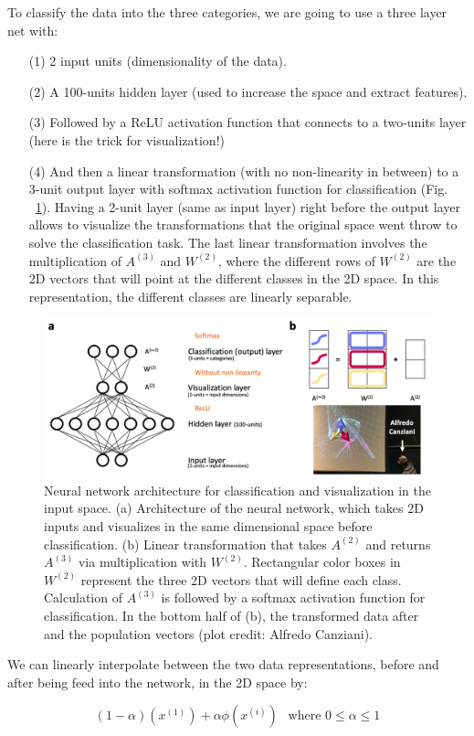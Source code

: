 \noindent
To classify the data into the three categories, we are going to use a three layer net with: 
\begin{itemize}
\item[(1)] 2 input units (dimensionality of the data).
\item[(2)] A 100-units hidden layer (used to increase the space and extract features).
\item[(3)] Followed by a ReLU activation function that connects to a two-units layer (here is the trick for visualization!) 
\item[(4)] And then a linear transformation (with no non-linearity in between) to a 3-unit output layer with softmax activation function for classification 
(Fig. ~\ref{fig:ArchitectureForClassificationAndVisualizationInTheInputSpace}). 
Having a 2-unit layer (same as input layer) right before the output layer allows to visualize the transformations 
that the original space went throw to solve the classification task. 
The last linear transformation involves the multiplication of $A^{(3)}$ and $W^{(2)}$, 
where the different rows of $W^{(2)}$ are the 2D vectors that will point at the different classes in the 2D space. 
In this representation, the different classes are linearly separable.
\end{itemize}

\begin{figure}[!h]
\centering
\includegraphics[width=170mm]{lectures/04-a/images/ArchitectureForClassificationAndVisualizationInTheInputSpace.png}
\caption{Neural network architecture for classification and visualization in the input space. (a) Architecture of the neural network, which takes 2D inputs and visualizes in the same dimensional space before classification. (b) Linear transformation that takes $A^{(2)}$ and returns $A^{(3)}$ via multiplication with $W^{(2)}$. Rectangular color boxes in $W^{(2)}$ represent the three 2D vectors that will define each class. Calculation of $A^{(3)}$ is followed by a softmax activation function for classification. In the bottom half of (b), the transformed data after and the population vectors (plot credit: Alfredo Canziani).}
\label{fig:ArchitectureForClassificationAndVisualizationInTheInputSpace}
\end{figure}

\noindent
We can linearly interpolate between the two data representations, before and 
after being feed into the network, in the 2D space by:

\[
(1-\alpha)(x^{(1)}) + \alpha \phi (x^{(i)}) ~~\text{ where } 0 \leq \alpha \leq 1
\]

